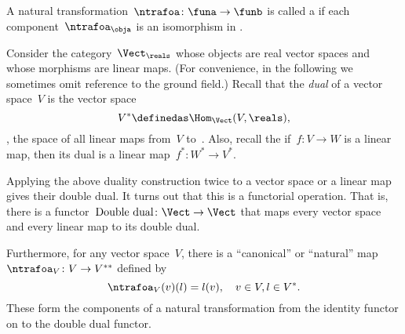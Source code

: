 \begin{figure}[h!]
  \begin{center}
  \end{center}
  \caption{}
  \label{fig:nat_trans_graphically}
\end{figure}

\begin{ctdefinition}
  \label{def:nat_iso}
  A natural transformation~$\ntrafoa \colon \funa \to \funb $ is called a \emph{} if each component~$\ntrafoa_\obja$ is an isomorphism in \CatD.
\end{ctdefinition}




\begin{example}\label{ex:Vect}
  Consider the category~$\Vect_{\reals}$ whose objects are real vector spaces and whose morphisms are linear maps. (For convenience, in the following we sometimes omit reference to the ground field.) Recall that the \emph{dual} of a vector space~$V$ is the vector space
  \begin{equation*}
    V^* \definedas \Hom_{\Vect}(V, \reals),
  \end{equation*}
  \ie , the space of all linear maps from~$V$ to~\reals. Also, recall the if~$f\colon V \to W$ is a linear map, then its dual is a linear map~$f^*\colon W^* \to V^*$.

  Applying the above duality construction twice to a vector space or a linear map gives their double dual. It turns out that this is a functorial operation. That is, there is a functor~$\text{Double dual}\colon \Vect \to \Vect$ that maps every vector space and every linear map to its double dual.

  Furthermore, for any vector space~$V$, there is a ``canonical'' or ``natural'' map~$\ntrafoa_V \colon V \to V^{**}$ defined by
  \begin{equation*}
    \ntrafoa_V(v)(l) = l(v), \quad  v \in V, l \in V^*.
  \end{equation*}
  These form the components of a natural transformation from the identity functor on \Vect to the double dual functor.
  \begin{center}
  \end{center}
\end{example}




